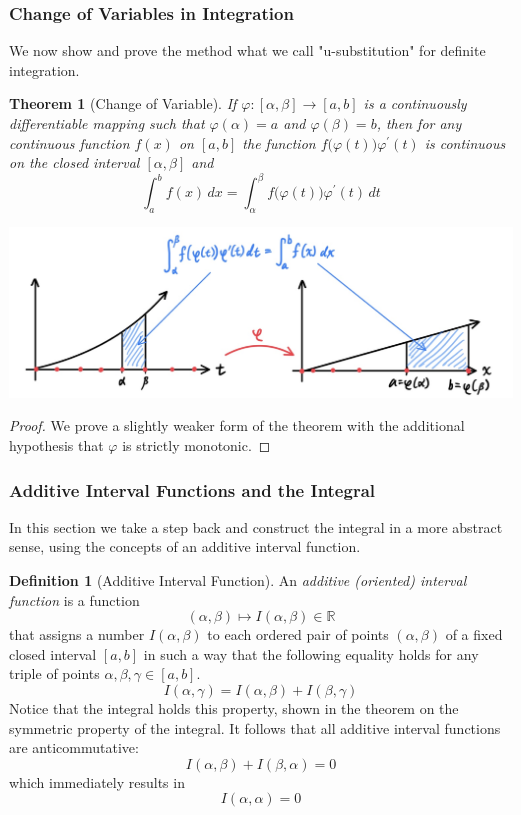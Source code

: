 \documentclass{article}
\newtheorem{theorem}{Theorem}[section]
\theoremstyle{remark}
\theoremstyle{definition}
\newtheorem{definition}{Definition}[section]
\begin{document}
\subsubsection{Change of Variables in Integration}
We now show and prove the method what we call "u-substitution" for definite integration. 

\begin{theorem}[Change of Variable]
If $\varphi: [\alpha, \beta] \longrightarrow [a, b]$ is a continuously differentiable mapping such that $\varphi(\alpha) = a$ and $\varphi(\beta) = b$, then for any continuous function $f(x)$ on $[a, b]$ the function $f\big(\varphi(t)\big) \varphi^\prime (t)$ is continuous on the closed interval $[\alpha, \beta]$ and 
\[\int_a^b f(x)\,dx = \int_\alpha^\beta f\big(\varphi(t)\big) \varphi^\prime(t)\,dt\]
\begin{center}
    \includegraphics[scale=0.3]{img/Change_of_Variable_Analysis_Integral.jpg}
\end{center}
\end{theorem}
\begin{proof}
We prove a slightly weaker form of the theorem with the additional hypothesis that $\varphi$ is strictly monotonic. 
\end{proof}

\subsubsection{Additive Interval Functions and the Integral}
In this section we take a step back and construct the integral in a more abstract sense, using the concepts of an additive interval function. 

\begin{definition}[Additive Interval Function]
An \textit{additive (oriented) interval function} is a function 
\[(\alpha, \beta) \mapsto I(\alpha, \beta) \in \mathbb{R}\]
that assigns a number $I(\alpha, \beta)$ to each ordered pair of points $(\alpha, \beta)$ of a fixed closed interval $[a, b]$ in such a way that the following equality holds for any triple of points $\alpha, \beta, \gamma \in [a, b]$. 
\[I(\alpha, \gamma) = I(\alpha, \beta) + I(\beta, \gamma)\]
Notice that the integral holds this property, shown in the theorem on the symmetric property of the integral. It follows that all additive interval functions are anticommutative: 
\[I(\alpha, \beta) + I(\beta, \alpha) = 0\]
which immediately results in
\[I(\alpha, \alpha) = 0\]
\end{definition}
\end{document}
